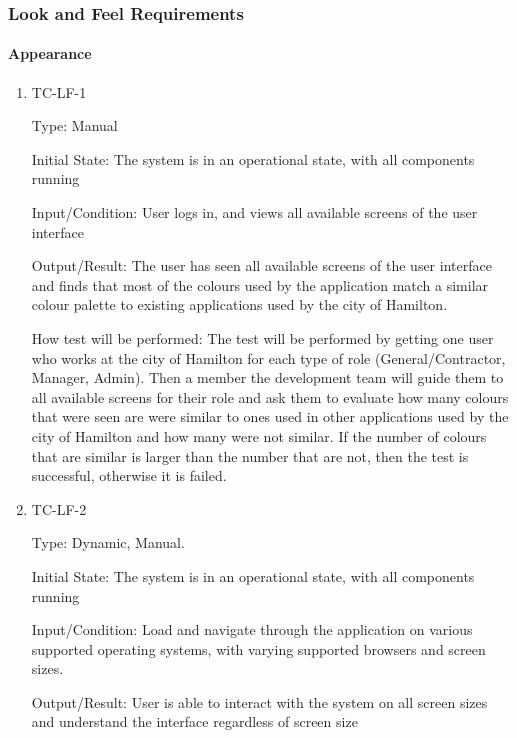 \documentclass[12pt, titlepage]{article}
\begin{document}
\subsubsection{Look and Feel Requirements}

\paragraph{Appearance}

\begin{enumerate}

  \item{TC-LF-1\\}

    Type: Manual

    Initial State: The system is in an operational state, with all
    components running

    Input/Condition: User logs in, and views all available screens of
    the user interface

    Output/Result: The user has seen all available screens of the
    user interface and finds that most of the colours used by the
    application match a similar colour palette to existing
    applications used by the city of Hamilton.

    How test will be performed: The test will be performed by getting
    one user who works at the city of Hamilton for each type of role
    (General/Contractor, Manager, Admin). Then a member the
    development team will guide them to all available screens for their role and
    ask them to evaluate how many colours that were seen are were
    similar to ones used in other applications used by the city of
    Hamilton and how many were not similar. If the number of colours
    that are similar is larger than the number that are not, then the
    test is successful, otherwise it is failed.

  \item{TC-LF-2\\}

    Type: Dynamic, Manual.

    Initial State: The system is in an operational state, with all
    components running

    Input/Condition: Load and navigate through the application on
    various supported operating systems, with varying supported
    browsers and screen sizes.

    Output/Result: User is able to interact with the system on all screen
    sizes and understand the interface regardless of screen size


\end{enumerate}
\end{document}
